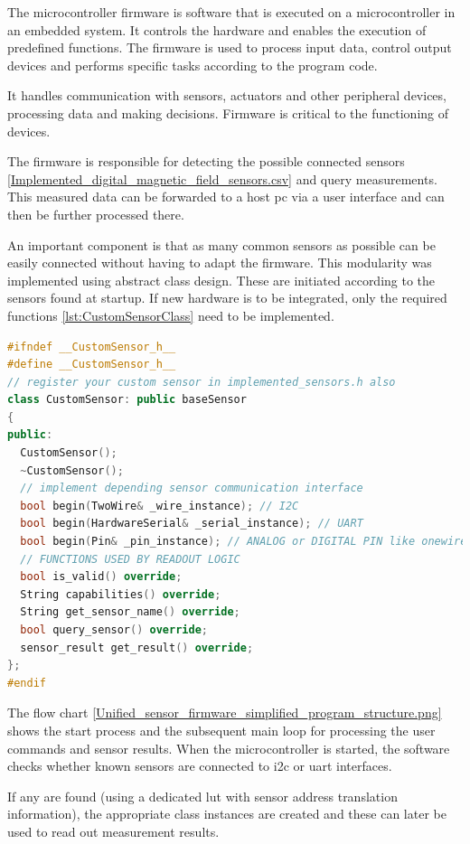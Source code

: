 The microcontroller firmware is software that is executed on a
microcontroller in an embedded system. It controls the hardware and
enables the execution of predefined functions. The firmware is used to
process input data, control output devices and performs specific tasks
according to the program code.

It handles communication with sensors, actuators and other peripheral
devices, processing data and making decisions. Firmware is critical to
the functioning of devices.

The firmware is responsible for detecting the possible connected sensors
\ref{Implemented_digital_magnetic_field_sensors.csv} and query
measurements. This measured data can be forwarded to a host \gls{pc} via
a user interface and can then be further processed there.

An important component is that as many common sensors as possible can be
easily connected without having to adapt the firmware. This modularity
was implemented using abstract class design. These are initiated
according to the sensors found at startup. If new hardware is to be
integrated, only the required functions \ref{lst:CustomSensorClass} need
to be implemented.

\begin{lstlisting}[language={C++}, caption={CustomSensor-Class for adding new sensor hardware support}, label=lst:CustomSensorClass]
#ifndef __CustomSensor_h__
#define __CustomSensor_h__
// register your custom sensor in implemented_sensors.h also
class CustomSensor: public baseSensor
{
public:
  CustomSensor();
  ~CustomSensor();
  // implement depending sensor communication interface
  bool begin(TwoWire& _wire_instance); // I2C
  bool begin(HardwareSerial& _serial_instance); // UART
  bool begin(Pin& _pin_instance); // ANALOG or DIGITAL PIN like onewire
  // FUNCTIONS USED BY READOUT LOGIC
  bool is_valid() override;
  String capabilities() override;
  String get_sensor_name() override;
  bool query_sensor() override;
  sensor_result get_result() override;        
};
#endif
\end{lstlisting}

The flow chart
\ref{Unified_sensor_firmware_simplified_program_structure.png} shows the
start process and the subsequent main loop for processing the user
commands and sensor results. When the microcontroller is started, the
software checks whether known sensors are connected to \gls{i2c} or
\gls{uart} interfaces.

If any are found (using a dedicated \gls{lut} with sensor address
translation information), the appropriate class instances are created
and these can later be used to read out measurement results.

